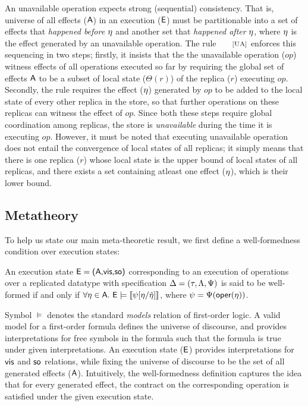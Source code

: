 An unavailable operation expects strong (sequential) consistency.
That is, universe of all effects (${\normalfont \textsf{A}}$) in an execution (${\normalfont \textsf{E}}$)
must be partitionable into a set of effects that \emph{happened
before} $\eta$ and another set that \emph{happened after} $\eta$,
where $\eta$ is the effect generated by an unavailable operation. The
rule $\rulelabel{UA}$ enforces this sequencing in two steps; firstly,
it insists that the the unavailable operation ($op$) witness effects
of all operations executed so far by requiring the global set of
effects ${\normalfont \textsf{A}}$ to be a subset of local state ($\Theta(r)$) of the
replica ($r$) executing $op$. Secondly, the rule requires the effect
($\eta$) generated by $op$ to be added to the local state of every
other replica in the store, so that further operations on these
replicas can witness the effect of $op$. Since both these steps
require global coordination among replicas, the store is
\emph{unavailable} during the time it is executing $op$. However, it
must be noted that executing unavailable operation does not entail the
convergence of local states of all replicas; it simply means that
there is one replica ($r$) whose local state is the upper bound of
local states of all replicas, and there exists a set containing
atleast one effect ($\eta$), which is their lower bound.

\subsection{Metatheory}

To help us state our main meta-theoretic result, we first define a
well-formedness condition over execution states:

\begin{definition}
An execution state ${\normalfont \textsf{E}} = {\normalfont \textsf{({\normalfont \textsf{A}},\allowbreak {\normalfont \textsf{vis}},\allowbreak {\normalfont \textsf{so}})}}$ corresponding to an execution of
operations over a replicated datatype with specification $\Delta =
(\tau,\Lambda,\Psi)$ is said to be well-formed if and only if 
$\forall \eta \in {\normalfont \textsf{A}}. ~{\normalfont \textsf{E}} \models [\![\psi[\eta/\hat{\eta}]]\!]$, where $\psi =
\Psi({\normalfont \textsf{oper}}(\eta))$.
\end{definition}

Symbol $\models$ denotes the standard \emph{models} relation of
first-order logic.  A valid model for a first-order formula defines
the universe of discourse, and provides interpretations for free
symbols in the formula such that the formula is true under given
interpretations.  An execution state (${\normalfont \textsf{E}}$) provides interpretations
for ${\normalfont \textsf{vis}}$ and ${\normalfont \textsf{so}}$ relations, while fixing the universe of
discourse to be the set of all generated effects (${\normalfont \textsf{A}}$).
Intuitively, the well-formedness definition captures the idea that for
every generated effect, the contract on the corresponding operation is
satisfied under the given execution state. 

